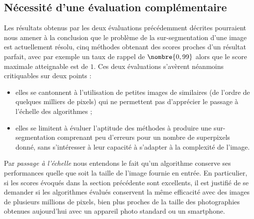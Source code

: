 \subsection{Nécessité d'une évaluation complémentaire}
Les résultats obtenus par les deux évaluations précédemment décrites \cite{achanta2012slic, stutz2015superpixel} pourraient nous amener à la conclusion que le problème de la sur-segmentation d'une image est actuellement résolu, cinq méthodes obtenant des scores proches d'un résultat parfait, avec par exemple un taux de rappel de $\nombre{0,99}$ alors que le score maximale atteignable est de $1$. Ces deux évaluations s'avèrent néanmoins critiquables sur deux points : 
\begin{itemize}
\item elles se cantonnent à l'utilisation de petites images de  similaires (de l'ordre de quelques milliers de pixels) qui ne permettent pas d'apprécier le passage à l'échelle des algorithmes ;
\item  elles se limitent à évaluer l'aptitude des méthodes à produire une sur-segmentation comprenant peu d'erreurs pour un nombre de superpixels donné, sans s'intéresser à leur capacité à s'adapter à la complexité de l'image.
\end{itemize}  

Par \emph{passage à l'échelle} nous entendons le fait qu'un algorithme conserve ses performances quelle que soit la taille de l'image fournie en entrée. En particulier, si les scores évoqués dans la section précédente sont excellents, il est justifié de se demander si les algorithmes évalués conservent la même efficacité avec des images de plusieurs millions de pixels, bien plus proches de la taille des photographies obtenues aujourd'hui avec un appareil photo standard ou un smartphone.

